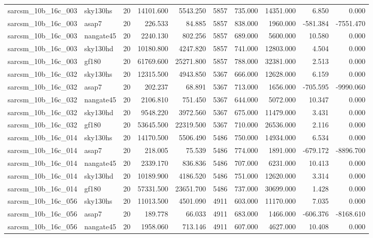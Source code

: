 \begin{tabular}{llrrrrrrrr}
sarcsm\_10b\_16c\_003 & sky130hs & 20 & 14101.600 & 5543.250 & 5857 & 735.000 & 14351.000 & 6.850 & 0.000 \\
sarcsm\_10b\_16c\_003 & asap7 & 20 & 226.533 & 84.885 & 5857 & 838.000 & 1960.000 & -581.384 & -7551.470 \\
sarcsm\_10b\_16c\_003 & nangate45 & 20 & 2240.130 & 802.256 & 5857 & 689.000 & 5600.000 & 10.580 & 0.000 \\
sarcsm\_10b\_16c\_003 & sky130hd & 20 & 10180.800 & 4247.820 & 5857 & 741.000 & 12803.000 & 4.504 & 0.000 \\
sarcsm\_10b\_16c\_003 & gf180 & 20 & 61769.600 & 25271.800 & 5857 & 788.000 & 32381.000 & 2.513 & 0.000 \\
sarcsm\_10b\_16c\_032 & sky130hs & 20 & 12315.500 & 4943.850 & 5367 & 666.000 & 12628.000 & 6.159 & 0.000 \\
sarcsm\_10b\_16c\_032 & asap7 & 20 & 202.237 & 68.891 & 5367 & 713.000 & 1656.000 & -705.595 & -9990.060 \\
sarcsm\_10b\_16c\_032 & nangate45 & 20 & 2106.810 & 751.450 & 5367 & 644.000 & 5072.000 & 10.347 & 0.000 \\
sarcsm\_10b\_16c\_032 & sky130hd & 20 & 9548.220 & 3972.560 & 5367 & 675.000 & 11479.000 & 3.431 & 0.000 \\
sarcsm\_10b\_16c\_032 & gf180 & 20 & 53645.500 & 22319.500 & 5367 & 710.000 & 26536.000 & 2.116 & 0.000 \\
sarcsm\_10b\_16c\_014 & sky130hs & 20 & 14170.500 & 5506.490 & 5486 & 750.000 & 14934.000 & 6.534 & 0.000 \\
sarcsm\_10b\_16c\_014 & asap7 & 20 & 218.005 & 75.539 & 5486 & 774.000 & 1891.000 & -679.172 & -8896.700 \\
sarcsm\_10b\_16c\_014 & nangate45 & 20 & 2339.170 & 836.836 & 5486 & 707.000 & 6231.000 & 10.413 & 0.000 \\
sarcsm\_10b\_16c\_014 & sky130hd & 20 & 10189.900 & 4186.520 & 5486 & 751.000 & 12620.000 & 3.314 & 0.000 \\
sarcsm\_10b\_16c\_014 & gf180 & 20 & 57331.500 & 23651.700 & 5486 & 737.000 & 30699.000 & 1.428 & 0.000 \\
sarcsm\_10b\_16c\_056 & sky130hs & 20 & 11013.500 & 4501.090 & 4911 & 603.000 & 11170.000 & 7.035 & 0.000 \\
sarcsm\_10b\_16c\_056 & asap7 & 20 & 189.778 & 66.033 & 4911 & 683.000 & 1466.000 & -606.376 & -8168.610 \\
sarcsm\_10b\_16c\_056 & nangate45 & 20 & 1958.060 & 713.146 & 4911 & 607.000 & 4627.000 & 10.408 & 0.000 \\

\end{tabular}
